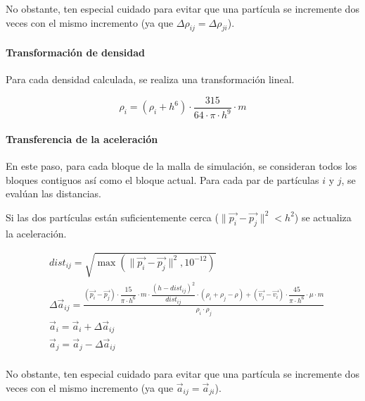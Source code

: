 No obstante, ten especial cuidado para evitar que una partícula se incremente dos
veces con el mismo incremento (ya que $\Delta \rho_{ij} = \Delta \rho_{ji}$).

\paragraph{Transformación de densidad}
Para cada densidad calculada, se realiza una transformación lineal.

\[
\rho_i = (\rho_i + h^6) \cdot \frac{315}{64 \cdot \pi \cdot h^9} \cdot m
\]

\paragraph{Transferencia de la aceleración}
En este paso, para cada bloque de la malla de simulación, se consideran todos 
los bloques contiguos así como el bloque actual. Para cada par de partículas
$i$ y $j$, se evalúan las distancias.

Si las dos partículas están suficientemente cerca 
($\|\vec{p_i} - \vec{p_j}\|^2 < h^2$) se actualiza la aceleración.

\[
\begin{split}
& dist_{ij} = \sqrt{\max(\|\vec{p_i} - \vec{p_j}\|^2, 10^{-12})} \\
& \Delta \vec{a}_{ij} = 
  \frac{
    (\vec{p_i} - \vec{p_j}) \cdot \dfrac{15}{\pi \cdot h^6} \cdot m \cdot 
    \dfrac{(h - dist_{ij})^2}{dist_{ij}} \cdot (\rho_i + \rho_j - \rho) +
    (\vec{v_j} - \vec{v_i}) \cdot \dfrac{45}{\pi \cdot h^6} \cdot \mu \cdot m
  }{
    \rho_i \cdot \rho_j    
  } \\
& \vec{a}_i = \vec{a}_i + \Delta \vec{a}_{ij}\\
& \vec{a}_j = \vec{a}_j - \Delta \vec{a}_{ij}\\
\end{split}
\]

No obstante, ten especial cuidado para evitar que una partícula se incremente dos
veces con el mismo incremento (ya que $\vec{a}_{ij} = \vec{a}_{ji}$).
